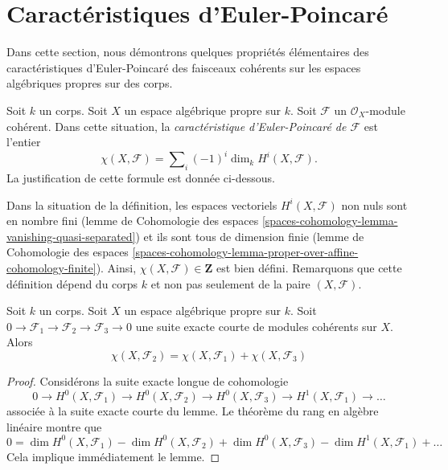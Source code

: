 \section{Caractéristiques d'Euler-Poincaré}
\label{section-euler}

\noindent
Dans cette section, nous démontrons quelques propriétés élémentaires des caractéristiques
d'Euler-Poincaré des faisceaux cohérents sur les espaces algébriques propres sur des corps.

\begin{definition}
\label{definition-euler-characteristic}
Soit $k$ un corps. Soit $X$ un espace algébrique propre sur $k$. Soit $\mathcal{F}$
un $\mathcal{O}_X$-module cohérent. Dans cette situation, la
{\it caractéristique d'Euler-Poincaré de $\mathcal{F}$} est l'entier
$$
\chi(X, \mathcal{F}) = \sum\nolimits_i (-1)^i \dim_k H^i(X, \mathcal{F}).
$$
La justification de cette formule est donnée ci-dessous.
\end{definition}

\noindent
Dans la situation de la définition, les espaces vectoriels
$H^i(X, \mathcal{F})$ non nuls sont en nombre fini (lemme de Cohomologie des espaces
\ref{spaces-cohomology-lemma-vanishing-quasi-separated})
et ils sont tous de dimension finie
(lemme de Cohomologie des espaces
\ref{spaces-cohomology-lemma-proper-over-affine-cohomology-finite}). Ainsi,
$\chi(X, \mathcal{F}) \in \mathbf{Z}$ est bien défini. Remarquons que
cette définition dépend du corps $k$ et non pas seulement de la paire
$(X, \mathcal{F})$.

\begin{lemma}
\label{lemma-euler-characteristic-additive}
Soit $k$ un corps. Soit $X$ un espace algébrique propre sur $k$.
Soit $0 \to \mathcal{F}_1 \to \mathcal{F}_2 \to \mathcal{F}_3 \to 0$
une suite exacte courte de modules cohérents sur $X$. Alors
$$
\chi(X, \mathcal{F}_2) = \chi(X, \mathcal{F}_1) + \chi(X, \mathcal{F}_3)
$$
\end{lemma}

\begin{proof}
Considérons la suite exacte longue de cohomologie
$$
0 \to H^0(X, \mathcal{F}_1) \to H^0(X, \mathcal{F}_2) \to
H^0(X, \mathcal{F}_3) \to H^1(X, \mathcal{F}_1) \to \ldots
$$
associée à la suite exacte courte du lemme. Le théorème du rang
en algèbre linéaire montre que
$$
0 = \dim H^0(X, \mathcal{F}_1) - \dim H^0(X, \mathcal{F}_2)
+ \dim H^0(X, \mathcal{F}_3) - \dim H^1(X, \mathcal{F}_1) + \ldots
$$
Cela implique immédiatement le lemme.
\end{proof}


